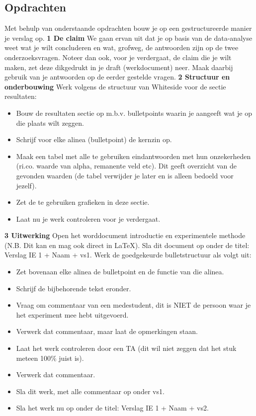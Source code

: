 \subsection{Opdrachten}
Met behulp van onderstaande opdrachten bouw je op een gestructureerde manier je verslag op.\newline\newline
\textbf{1	De claim}
\newline
We gaan ervan uit dat je op basis van de data-analyse weet wat je wilt concluderen en wat, grofweg, de antwoorden zijn op de twee onderzoeksvragen. Noteer dan ook, voor je verdergaat, de claim die je wilt maken, zet deze dikgedrukt in je draft (werkdocument) neer. Maak daarbij gebruik van je antwoorden op de eerder gestelde vragen.\newline\newline
%
\textbf{2	Structuur en onderbouwing}
\newline
Werk volgens de structuur van Whiteside voor de sectie resultaten:
%
\begin{itemize}
    \item Bouw de resultaten sectie op m.b.v. bulletpoints waarin je aangeeft wat je op die plaats wilt zeggen.
    \item Schrijf voor elke alinea (bulletpoint) de kernzin op.
    \item Maak een tabel met alle te gebruiken eindantwoorden met hun onzekerheden (ri.co. waarde van alpha, remanente veld etc). Dit geeft overzicht van de gevonden waarden (de tabel verwijder je later en is alleen bedoeld voor jezelf).
    \item Zet de te gebruiken grafieken in deze sectie.
    \item Laat nu je werk controleren voor je verdergaat. 
\end{itemize}
%
\textbf{3	Uitwerking}
\newline
Open het worddocument introductie en experimentele methode (N.B. Dit kan en mag ook direct in LaTeX). Sla dit document op onder de titel: Verslag IE 1 + Naam + vs1. Werk de goedgekeurde bulletstructuur als volgt uit:
\begin{itemize}
    \item Zet bovenaan elke alinea de bulletpoint en de functie van die alinea.
    \item Schrijf de bijbehorende tekst eronder.
    \item Vraag om commentaar van een medestudent, dit is NIET de persoon waar je het experiment mee hebt uitgevoerd. 
    \item Verwerk dat commentaar, maar laat de opmerkingen staan.
    \item Laat het werk controleren door een TA (dit wil niet zeggen dat het stuk meteen 100\% juist is).
    \item Verwerk dat commentaar.
    \item Sla dit werk, met alle commentaar op onder vs1. 
    \item Sla het werk nu op onder de titel: Verslag IE 1 + Naam + vs2.
\end{itemize}
